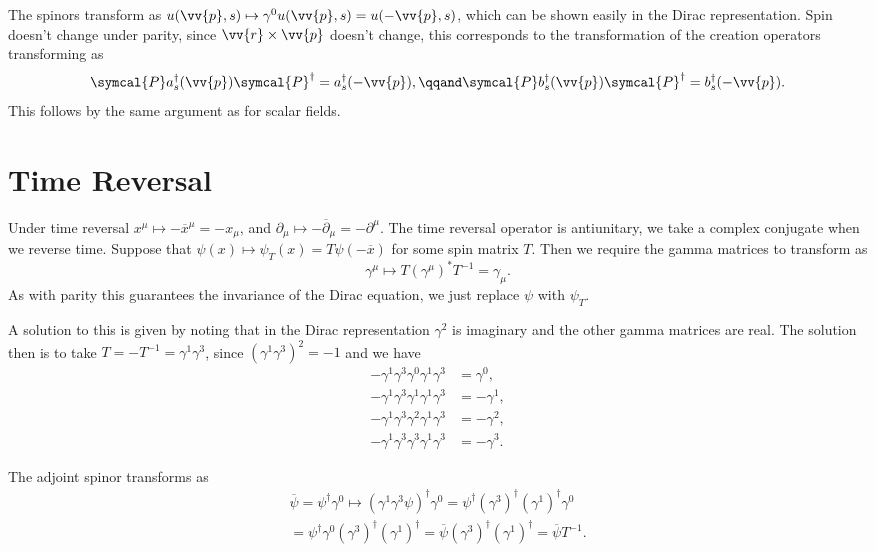 \documentclass[fleqn]{NotesClass}
\newcommand{\parity}{\symcal{P}}
\newcommand{\hermit}{{\dagger}}
\newcommand{\diracadjoint}[1]{\overbar{#1}}
\begin{document}
    The spinors transform as \(u(\vv{p}, s) \mapsto \gamma^0u(\vv{p}, s) = u(-\vv{p}, s)\), which can be shown easily in the Dirac representation.
    Spin doesn't change under parity, since \(\vv{r} \times \vv{p}\) doesn't change, this corresponds to the transformation of the creation operators transforming as
    \begin{equation}
        \parity a_s^\hermit(\vv{p}) \parity^\hermit = a_s^\hermit(-\vv{p}), \qqand \parity b_s^\hermit(\vv{p}) \parity^\hermit = b_s^\hermit(-\vv{p}).
    \end{equation}
    This follows by the same argument as for scalar fields.
    
    \section{Time Reversal}
    Under time reversal \(x^\mu \mapsto -\overbar{x}^\mu = -x_\mu\), and \(\partial_\mu \mapsto -\overbar{\partial}_\mu = -\partial^\mu\).
    The time reversal operator is antiunitary, we take a complex conjugate when we reverse time.
    Suppose that \(\psi(x) \mapsto \psi_T(x) = T\psi(-\overbar{x})\) for some spin matrix \(T\).
    Then we require the gamma matrices to transform as
    \begin{equation}
        \gamma^\mu \mapsto T(\gamma^\mu)^* T^{-1} = \gamma_\mu.
    \end{equation}
    As with parity this guarantees the invariance of the Dirac equation, we just replace \(\psi\) with \(\psi_T\).
    
    A solution to this is given by noting that in the Dirac representation \(\gamma^2\) is imaginary and the other gamma matrices are real.
    The solution then is to take \(T = -T^{-1} = \gamma^1\gamma^3\), since \((\gamma^1\gamma^3)^2 = -1\) and we have
    \begin{align}
        -\gamma^1\gamma^3\gamma^0\gamma^1\gamma^3 &= \gamma^0,\\
        -\gamma^1\gamma^3\gamma^1\gamma^1\gamma^3 &= -\gamma^1,\\
        -\gamma^1\gamma^3\gamma^2\gamma^1\gamma^3 &= -\gamma^2,\\
        -\gamma^1\gamma^3\gamma^3\gamma^1\gamma^3 &= -\gamma^3.
    \end{align}
    
    The adjoint spinor transforms as
    \begin{multline}
        \diracadjoint{\psi} = \psi^\hermit \gamma^0 \mapsto (\gamma^1\gamma^3\psi)^\hermit \gamma^0 = \psi^\hermit (\gamma^3)^\hermit (\gamma^1)^\hermit \gamma^0\\
        = \psi^\hermit \gamma^0 (\gamma^3)^\hermit (\gamma^1)^\hermit = \diracadjoint{\psi} (\gamma^3)^\hermit (\gamma^1)^\hermit = \diracadjoint{\psi} T^{-1}.
    \end{multline}
    
\end{document}
